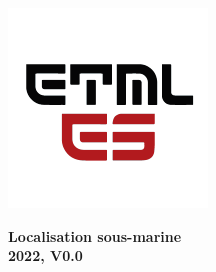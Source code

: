
\author{Ali Zoubir }
\date{November 2022}

\pagestyle{fancy}

\chead {\monthyeardate\today}


\onecolumn


\begin{figure}
\begin{minipage}{0.47\textwidth}
\centering
\includegraphics[width=.4\textwidth,left,]{../ETML-ES-LOGO.png}
\end{minipage}

\hfill
\begin{minipage}{0.7\textwidth}
\raggedleft
\LARGE \textbf{Localisation sous-marine\\ 2022, V0.0}
\end{minipage}
\end{figure}

